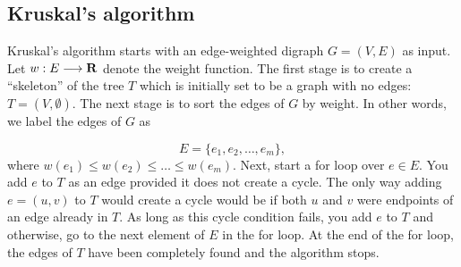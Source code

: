 \subsection{Kruskal's algorithm}

Kruskal's algorithm starts with an edge-weighted digraph $G=(V,E)$
as input. Let $w:E\longrightarrow \mathbf{R}$ denote the weight function.
The first stage is to create a ``skeleton'' of the
tree $T$ which is initially set to be a graph with no
edges: $T=(V,\emptyset)$. The next stage is to
sort the edges of $G$ by weight. In other words, we
label the edges of $G$ as

\[
E = \{e_1,e_2,\dots ,e_m\},
\]
where $w(e_1) \leq w(e_2) \leq \dots \leq w(e_m)$.
Next, start a for loop over $e\in E$. You add
$e$ to $T$ as an edge provided it does not create
a cycle. The only way adding $e=(u,v)$ to $T$ would
create a cycle would be if both $u$ and $v$ were
endpoints of an edge already in $T$. As long as this
cycle condition fails, you add $e$ to $T$ and otherwise,
go to the next element of $E$ in the for loop.
At the end of the for loop, the edges of $T$ have
been completely found and the algorithm stops.

